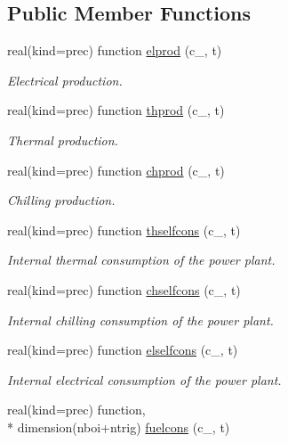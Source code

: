 \subsection*{Public Member Functions}
\begin{DoxyCompactItemize}
\item 
real(kind=prec) function \hyperlink{classenergy_a5ce8ae58805b4f7abe840bedaea30a00}{elprod} (c\-\_\-, t)
\begin{DoxyCompactList}\small\item\em Electrical production. \end{DoxyCompactList}\item 
real(kind=prec) function \hyperlink{classenergy_a40ddda3c07be743826be8c2e982b9b98}{thprod} (c\-\_\-, t)
\begin{DoxyCompactList}\small\item\em Thermal production. \end{DoxyCompactList}\item 
real(kind=prec) function \hyperlink{classenergy_a78e3e5b7396e41d13b3c9aa8f4edca48}{chprod} (c\-\_\-, t)
\begin{DoxyCompactList}\small\item\em Chilling production. \end{DoxyCompactList}\item 
real(kind=prec) function \hyperlink{classenergy_af385040819d802e1a3c9e0c9a692ff0a}{thselfcons} (c\-\_\-, t)
\begin{DoxyCompactList}\small\item\em Internal thermal consumption of the power plant. \end{DoxyCompactList}\item 
real(kind=prec) function \hyperlink{classenergy_ad0d7a76ef1e071f3332e04573b6973a3}{chselfcons} (c\-\_\-, t)
\begin{DoxyCompactList}\small\item\em Internal chilling consumption of the power plant. \end{DoxyCompactList}\item 
real(kind=prec) function \hyperlink{classenergy_af5299e75015a3803765a6b49efa22049}{elselfcons} (c\-\_\-, t)
\begin{DoxyCompactList}\small\item\em Internal electrical consumption of the power plant. \end{DoxyCompactList}\item 
real(kind=prec) function, \\*
dimension(nboi+ntrig) \hyperlink{classenergy_a07a977e68ea1d19da65ba06a4e4007a2}{fuelcons} (c\-\_\-, t)

\end{DoxyCompactItemize}
